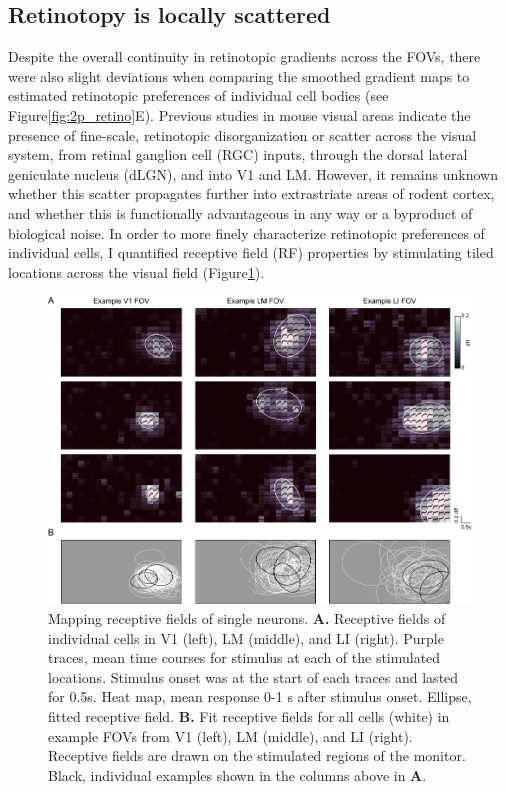 \subsection{Retinotopy is locally scattered}
Despite the overall continuity in retinotopic gradients across the FOVs, there were also slight deviations when comparing the smoothed gradient maps to estimated retinotopic preferences of individual cell bodies (see Figure\ref{fig:2p_retino}E). Previous studies in mouse visual areas indicate the presence of fine-scale, retinotopic disorganization or scatter across the visual system, from retinal ganglion cell (RGC) inputs, through the dorsal lateral geniculate nucleus (dLGN), and into V1 and LM\cite{Bonin2011, Andermann2011, Liang2018, Marques2018}. However, it remains unknown whether this scatter propagates further into extrastriate areas of rodent cortex, and whether this is functionally advantageous in any way or a byproduct of biological noise. In order to more finely characterize retinotopic preferences of individual cells, I quantified receptive field (RF) properties by stimulating tiled locations across the visual field (Figure\ref{fig:rf_examples}). 

\begin{figure}[t!]
    \includegraphics[width=\textwidth]{figures/chapter_3/fig_3-3_rf_examples/fig_3-3_rf_examples.pdf}
    \vspace{.1in}
    \caption[Receptive field mapping]{Mapping receptive fields of single neurons. \textbf{A.} Receptive fields of individual cells in V1 (left), LM (middle), and LI (right). Purple traces, mean time courses for stimulus at each of the stimulated locations. Stimulus onset was at the start of each traces and lasted for 0.5s. Heat map, mean response 0-1 s after stimulus onset. Ellipse, fitted receptive field.
    \textbf{B.} Fit receptive fields for all cells (white) in example FOVs from V1 (left), LM (middle), and LI (right). Receptive fields are drawn on the stimulated regions of the monitor. Black, individual examples shown in the columns above in \textbf{A}.
    \label{fig:rf_examples}}
\end{figure}

